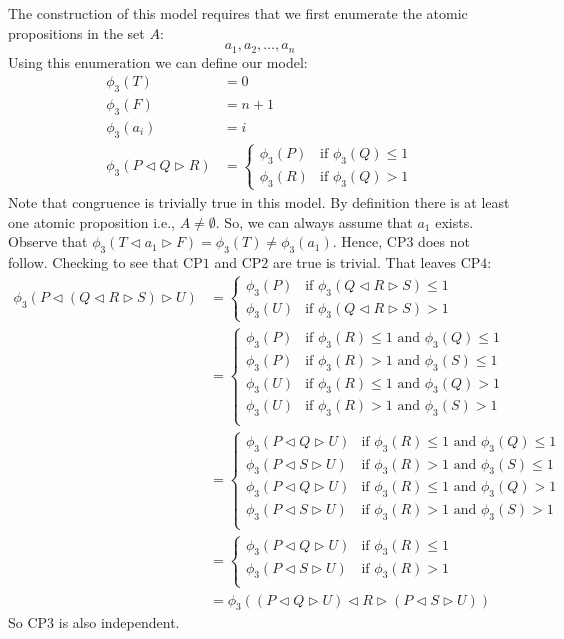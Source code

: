 \documentclass[a4paper,twoside,openright]{report}
\newcommand{\CP}[1]{\ensuremath{\mathrm{CP#1}}}
\newcommand{\lef}{\ensuremath{\triangleleft}}
\newcommand{\rig}{\ensuremath{\triangleright}}
\begin{document}
The construction of this model requires that we first enumerate the atomic propositions in the set $A$:
\[
a_1,a_2,\ldots,a_n
\]
Using this enumeration we can define our model: 
\begin{align*}
\phi_3(T) &= 0\\
\phi_3(F) &= n+1\\
\phi_3(a_i) &= i\\
\phi_3(P\lef Q\rig R) &= \begin{cases}
\phi_3(P) & \text{if $\phi_3(Q)\le 1$}\\
\phi_3(R) & \text{if $\phi_3(Q)> 1$}
\end{cases}
\end{align*}
Note that congruence is trivially true in this model. By definition there is at least one atomic proposition i.e., $A\ne\emptyset$. So, we can always assume that $a_1$ exists. Observe that $\phi_3(T\lef a_1\rig F)=\phi_3(T)\ne\phi_3(a_1)$. Hence, \CP3 does not follow. Checking to see that \CP1 and \CP2 are true is trivial. That leaves \CP4:
\begin{align*}
\phi_3(P\lef(Q\lef R\rig S)\rig U)
&=\begin{cases}
\phi_3(P)&\text{if $\phi_3(Q\lef R\rig S)\le 1$}\\
\phi_3(U)&\text{if $\phi_3(Q\lef R\rig S)>1$}
\end{cases}\\
&=\begin{cases}
\phi_3(P)&\text{if $\phi_3(R)\le 1$ and $\phi_3(Q)\le 1$}\\
\phi_3(P)&\text{if $\phi_3(R)> 1$ and $\phi_3(S)\le 1$}\\
\phi_3(U)&\text{if $\phi_3(R)\le 1$ and $\phi_3(Q)>1$}\\
\phi_3(U)&\text{if $\phi_3(R)> 1$ and $\phi_3(S)>1$}\\
\end{cases}\\
&=\begin{cases}
\phi_3(P\lef Q\rig U)&\text{if $\phi_3(R)\le 1$ and $\phi_3(Q)\le 1$}\\
\phi_3(P\lef S\rig U)&\text{if $\phi_3(R)> 1$ and $\phi_3(S)\le 1$}\\
\phi_3(P\lef Q\rig U)&\text{if $\phi_3(R)\le 1$ and $\phi_3(Q)>1$}\\
\phi_3(P\lef S\rig U)&\text{if $\phi_3(R)> 1$ and $\phi_3(S)>1$}\\
\end{cases}\\
&=\begin{cases}
\phi_3(P\lef Q\rig U)&\text{if $\phi_3(R)\le 1$}\\
\phi_3(P\lef S\rig U)&\text{if $\phi_3(R)> 1$}\\
\end{cases}\\
&=\phi_3((P\lef Q\rig U)\lef R\rig(P\lef S\rig U))
\end{align*}
So \CP3 is also independent.
\end{document}
